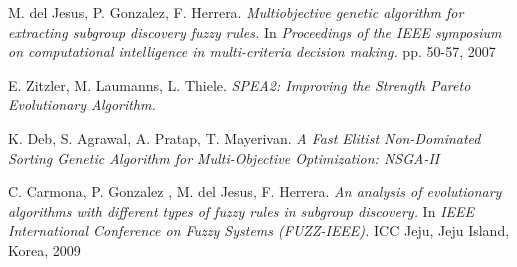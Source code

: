 \documentclass[]{article}
\begin{document}
\begin{thebibliography}{20}
\newblock M. del Jesus, P. Gonzalez, F. Herrera.
\newblock \emph{Multiobjective genetic algorithm for extracting subgroup discovery fuzzy rules.}
\newblock In \emph{Proceedings of the IEEE symposium on computational intelligence in multi-criteria decision making.} pp. 50-57, 2007

\newblock E. Zitzler, M. Laumanns, L. Thiele.
\newblock \emph{SPEA2: Improving the Strength Pareto Evolutionary Algorithm.}

\newblock K. Deb, S. Agrawal, A. Pratap, T. Mayerivan.
\newblock \emph{A Fast Elitist Non-Dominated Sorting Genetic Algorithm for Multi-Objective Optimization: NSGA-II}

\newblock C. Carmona, P. Gonzalez , M. del Jesus, F. Herrera.
\newblock \emph{An analysis of evolutionary algorithms with different types of fuzzy rules in subgroup discovery.} 
\newblock In \emph{IEEE International Conference on Fuzzy Systems (FUZZ-IEEE).}
\newblock ICC Jeju, Jeju Island, Korea, 2009

\end{thebibliography}
\end{document}
